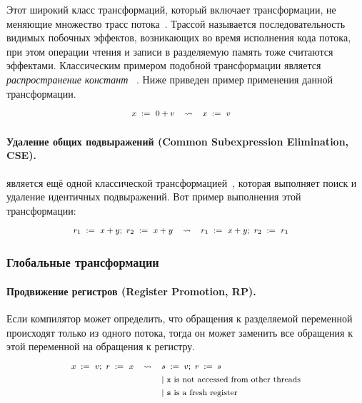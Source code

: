 Этот широкий класс трансформаций, который включает трансформации, 
не меняющие множество трасс потока~\cite{Sevcik-Aspinall:ECOOP08}.
Трассой называется последовательность видимых побочных эффектов,
возникающих во время исполнения кода потока, при этом 
операции чтения и записи в разделяемую память тоже считаются эффектами.
Классическим примером подобной трансформации является \emph{распространение констант}%
~\cite{Muchnick:ACDI97, Wegman-Zadeck:TOPLAS91}.
Ниже приведен пример применения данной трансформации. 
%
\[\def\arraystretch{1.4}\footnotesize
  \begin{array}{cccl} 

      \writeInst{}{x}{0 + v} 
    & \leadsto 
    & \writeInst{}{x}{v}
    & \\ 

  \end{array}
\]
  
\paragraph{
Удаление общих подвыражений
(Common Subexpression Elimination, CSE).
}

\CSE является ещё одной классической трансформацией~\cite{Muchnick:ACDI97}, 
которая выполняет поиск и удаление идентичных подвыражений.
Вот пример выполнения этой трансформации:
%
\[\def\arraystretch{1.4}\footnotesize
  \begin{array}{cccl} 

      \readInst{}{r_1}{x + y} \seq \readInst{}{r_2}{x + y} 
    & \leadsto 
    & \readInst{}{r_1}{x + y} \seq \readInst{}{r_2}{r_1}
    & \\ 

  \end{array}
\]

\subsubsection{Глобальные трансформации}

\paragraph{
Продвижение регистров
(Register Promotion, RP).
}

Если компилятор может определить, что 
обращения к разделяемой переменной 
происходят только из одного потока,
тогда он может заменить все обращения к этой переменной 
на обращения к регистру.
%
\[\def\arraystretch{1.4}\footnotesize
  \begin{array}{ccl} 

      \writeInst{}{x}{v} \seq \readInst{}{r}{x} 
    & \leadsto 
    & \assignInst{s}{v} \seq \assignInst{r}{s}
    \\ 
    
    & & |~ \text{\texttt{x} is not accessed from other threads} \\
    & & |~ \text{\texttt{s} is a fresh register} \\ 

  \end{array}
\]

